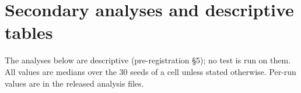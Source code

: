 
\section{Secondary analyses and descriptive tables}
\label{sec:supp-secondary}

The analyses below are descriptive (pre-registration \S5); no test is run on them. All values are medians over the
30 seeds of a cell unless stated otherwise. Per-run values are in the released analysis files.


